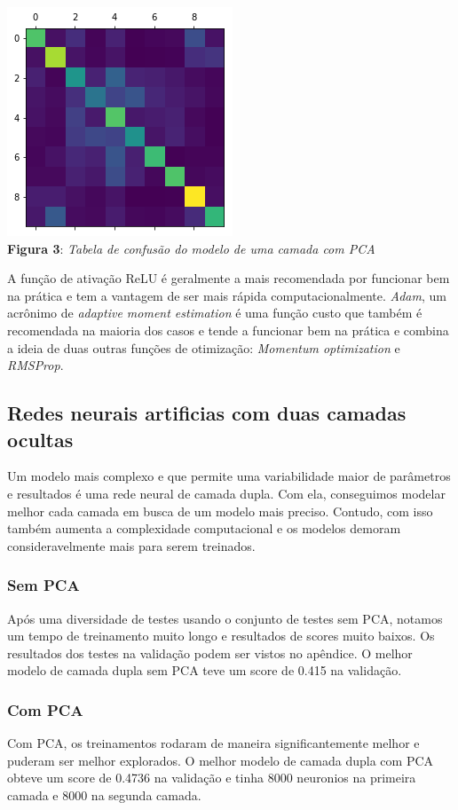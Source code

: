 \documentclass[conference]{IEEEtran}
\begin{document}
\begin{center}
\includegraphics[scale=0.75]{nnsimplespca.png}
\\
\textbf{Figura 3}: \textit{Tabela de confusão do modelo de uma camada com PCA}
\end{center}

A função de ativação ReLU é geralmente a mais recomendada por funcionar bem na prática e tem a vantagem de ser mais rápida computacionalmente.\cite{b6}
\textit{Adam}, um acrônimo de \textit{adaptive moment estimation} é uma função custo que também é recomendada na maioria dos casos e tende a funcionar bem na prática e combina a ideia de duas outras funções de otimização: \textit{Momentum optimization} e \textit{RMSProp}.\cite{b6}

\subsection{Redes neurais artificias com duas camadas ocultas}
Um modelo mais complexo e que permite uma variabilidade maior de parâmetros e resultados é uma rede neural de camada dupla. Com ela, conseguimos modelar melhor cada camada em busca de um modelo mais preciso. Contudo, com isso também aumenta a complexidade computacional e os modelos demoram consideravelmente mais para serem treinados.

\subsubsection{Sem PCA}
Após uma diversidade de testes usando o conjunto de testes sem PCA, notamos um tempo de treinamento muito longo e resultados de scores muito baixos. Os resultados dos testes na validação podem ser vistos no apêndice. O melhor modelo de camada dupla sem PCA teve um score de 0.415 na validação.

\subsubsection{Com PCA}
Com PCA, os treinamentos rodaram de maneira significantemente melhor e puderam ser melhor explorados. O melhor modelo de camada dupla com PCA obteve um score de 0.4736 na validação e tinha 8000 neuronios na primeira camada e 8000 na segunda camada.
\end{document}
